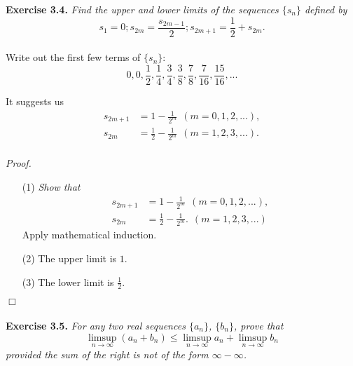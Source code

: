 \documentclass{article}
\begin{document}
\textbf{Exercise 3.4.}
\emph{Find the upper and lower limits of the sequences $\{s_n\}$ defined by
$$s_1 = 0; s_{2m} = \frac{s_{2m-1}}{2}; s_{2m+1} = \frac{1}{2} + s_{2m}.$$ } \\

Write out the first few terms of $\{s_n\}$:
$$0, 0, \frac{1}{2}, \frac{1}{4}, \frac{3}{4},
\frac{3}{8}, \frac{7}{8}, \frac{7}{16}, \frac{15}{16}, ...$$

It suggests us
\begin{align*}
s_{2m+1} &= 1 - \frac{1}{2^m} \:\: (m = 0, 1, 2, ...), \\
s_{2m} &= \frac{1}{2} - \frac{1}{2^m} \:\: (m = 1, 2, 3, ...). \\
\end{align*}

\emph{Proof.}
\begin{enumerate}
\item[(1)]
\emph{Show that
\begin{align*}
s_{2m+1} &= 1 - \frac{1}{2^m} \:\: (m = 0, 1, 2, ...), \\
s_{2m} &= \frac{1}{2} - \frac{1}{2^m}. \:\: (m = 1, 2, 3, ...)
\end{align*}}
Apply mathematical induction.
\item[(2)]
The upper limit is $1$.
\item[(3)]
The lower limit is $\frac{1}{2}$.
\end{enumerate}
$\Box$ \\\\






\textbf{Exercise 3.5.}
\emph{For any two real sequences $\{a_n\}$, $\{b_n\}$, prove that
$$\limsup_{n \to \infty} (a_n + b_n)
\leq \limsup_{n \to \infty} a_n + \limsup_{n \to \infty} b_n$$
provided the sum of the right is not of the form $\infty - \infty$.} \\
\end{document}

